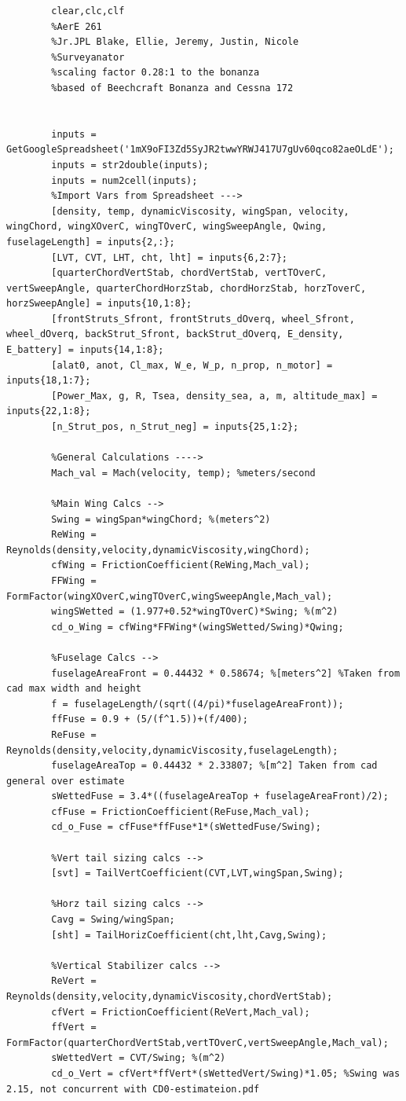 \documentclass[12pt,A4paper]{article}
\begin{document}
	\begin{lstlisting}
		clear,clc,clf
		%AerE 261
		%Jr.JPL Blake, Ellie, Jeremy, Justin, Nicole
		%Surveyanator
		%scaling factor 0.28:1 to the bonanza
		%based of Beechcraft Bonanza and Cessna 172
		
		
		inputs = GetGoogleSpreadsheet('1mX9oFI3Zd5SyJR2twwYRWJ417U7gUv60qco82aeOLdE');
		inputs = str2double(inputs);
		inputs = num2cell(inputs);
		%Import Vars from Spreadsheet --->
		[density, temp, dynamicViscosity, wingSpan, velocity, wingChord, wingXOverC, wingTOverC, wingSweepAngle, Qwing, fuselageLength] = inputs{2,:};
		[LVT, CVT, LHT, cht, lht] = inputs{6,2:7};
		[quarterChordVertStab, chordVertStab, vertTOverC, vertSweepAngle, quarterChordHorzStab, chordHorzStab, horzToverC, horzSweepAngle] = inputs{10,1:8};
		[frontStruts_Sfront, frontStruts_dOverq, wheel_Sfront, wheel_dOverq, backStrut_Sfront, backStrut_dOverq, E_density, E_battery] = inputs{14,1:8};
		[alat0, anot, Cl_max, W_e, W_p, n_prop, n_motor] = inputs{18,1:7};
		[Power_Max, g, R, Tsea, density_sea, a, m, altitude_max] = inputs{22,1:8};
		[n_Strut_pos, n_Strut_neg] = inputs{25,1:2};
		
		%General Calculations ---->
		Mach_val = Mach(velocity, temp); %meters/second
		
		%Main Wing Calcs -->
		Swing = wingSpan*wingChord; %(meters^2)
		ReWing = Reynolds(density,velocity,dynamicViscosity,wingChord);
		cfWing = FrictionCoefficient(ReWing,Mach_val);
		FFWing = FormFactor(wingXOverC,wingTOverC,wingSweepAngle,Mach_val);
		wingSWetted = (1.977+0.52*wingTOverC)*Swing; %(m^2)
		cd_o_Wing = cfWing*FFWing*(wingSWetted/Swing)*Qwing;
		
		%Fuselage Calcs -->
		fuselageAreaFront = 0.44432 * 0.58674; %[meters^2] %Taken from cad max width and height
		f = fuselageLength/(sqrt((4/pi)*fuselageAreaFront)); 
		ffFuse = 0.9 + (5/(f^1.5))+(f/400);
		ReFuse = Reynolds(density,velocity,dynamicViscosity,fuselageLength);
		fuselageAreaTop = 0.44432 * 2.33807; %[m^2] Taken from cad general over estimate
		sWettedFuse = 3.4*((fuselageAreaTop + fuselageAreaFront)/2);
		cfFuse = FrictionCoefficient(ReFuse,Mach_val);
		cd_o_Fuse = cfFuse*ffFuse*1*(sWettedFuse/Swing);
		
		%Vert tail sizing calcs -->
		[svt] = TailVertCoefficient(CVT,LVT,wingSpan,Swing);
		
		%Horz tail sizing calcs -->
		Cavg = Swing/wingSpan;
		[sht] = TailHorizCoefficient(cht,lht,Cavg,Swing);
		
		%Vertical Stabilizer calcs -->
		ReVert = Reynolds(density,velocity,dynamicViscosity,chordVertStab);
		cfVert = FrictionCoefficient(ReVert,Mach_val);
		ffVert = FormFactor(quarterChordVertStab,vertTOverC,vertSweepAngle,Mach_val);
		sWettedVert = CVT/Swing; %(m^2)
		cd_o_Vert = cfVert*ffVert*(sWettedVert/Swing)*1.05; %Swing was 2.15, not concurrent with CD0-estimateion.pdf
		

\end{lstlisting}
\end{document}
